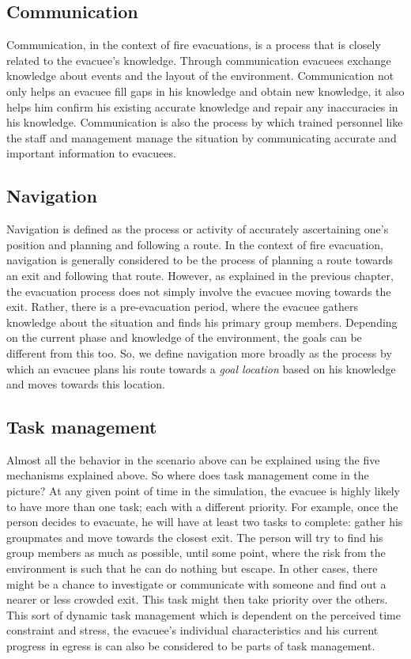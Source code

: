 \subsection{Communication}
\label{IBEVAC:Communication}

	Communication, in the context of fire evacuations, is a process that is closely related to the evacuee's knowledge. Through communication evacuees exchange knowledge about events and the layout of the environment. Communication not only helps an evacuee fill gaps in his knowledge and obtain new knowledge, it also helps him confirm his existing accurate knowledge and repair any inaccuracies in his knowledge. Communication is also the process by which trained personnel like the staff and management manage the situation by communicating accurate and important information to evacuees.

\subsection{Navigation}
\label{IBEVAC:Navigation}

	Navigation is defined as the process or activity of accurately ascertaining one's position and planning and following a route. In the context of fire evacuation, navigation is generally considered to be the process of planning a route towards an exit and following that route. However, as explained in the previous chapter, the evacuation process does not simply involve the evacuee moving towards the exit. Rather, there is a pre-evacuation period, where the evacuee gathers knowledge about the situation and finds his primary group members. Depending on the current phase and knowledge of the environment, the goals can be different from this too. So, we define navigation more broadly as the process by which an evacuee plans his route towards a \emph{goal location} based on his knowledge and moves towards this location.


\subsection{Task management}
\label{IBEVAC:TaskManagement}
	Almost all the behavior in the scenario above can be explained using the five mechanisms explained above. So where does task management come in the picture? At any given point of time in the simulation, the evacuee is highly likely to have more than one task; each with a different priority. For example, once the person decides to evacuate, he will have at least two tasks to complete: gather his groupmates and move towards the closest exit. The person will try to find his group members as much as possible, until some point, where the risk from the environment is such that he can do nothing but escape. In other cases, there might be a chance to investigate or communicate with someone and find out a nearer or less crowded exit. This task might then take priority over the others. This sort of dynamic task management which is dependent on the perceived time constraint and stress, the evacuee's individual characteristics and his current progress in egress is can also be considered to be parts of task management.

